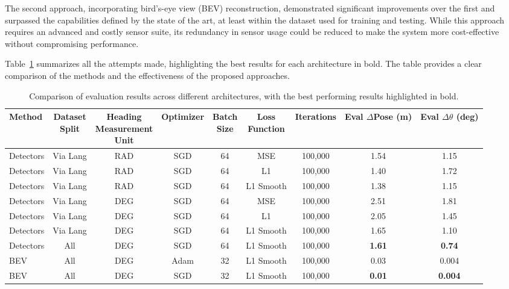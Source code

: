 The second approach, incorporating bird’s-eye view (BEV) reconstruction, demonstrated significant improvements over the first and surpassed the capabilities defined by the state of the art, at least within the dataset used for training and testing. While this approach requires an advanced and costly sensor suite, its redundancy in sensor usage could be reduced to make the system more cost-effective without compromising performance.

Table~\ref{tab:evaluation_results_2} summarizes all the attempts made, highlighting the best results for each architecture in bold. The table provides a clear comparison of the methods and the effectiveness of the proposed approaches.

\begin{table}[H]
\centering
\caption{Comparison of evaluation results across different architectures, with the best performing results highlighted in bold.}
\label{tab:evaluation_results_2}
\scriptsize
\renewcommand{\arraystretch}{1.2}
\setlength{\tabcolsep}{5pt}
\begin{tabular}{lcccccccc}
\toprule
\textbf{Method} & \makecell{\textbf{Dataset}\\\textbf{Split}} & \makecell{\textbf{Heading}\\\textbf{Measurement}\\\textbf{Unit}} & \textbf{Optimizer} & \makecell{\textbf{Batch}\\\textbf{Size}} & \makecell{\textbf{Loss}\\\textbf{Function}} & \textbf{Iterations} & \makecell{\textbf{Eval}\\$\Delta$\textbf{Pose}\\(m)} & \makecell{\textbf{Eval}\\$\Delta \theta$\\(deg)} \\
\midrule
Detectors & Via Lang & RAD & SGD  & 64 & MSE         & 100,000 & 1.54        & 1.15        \\
Detectors & Via Lang & RAD & SGD  & 64 & L1          & 100,000 & 1.40        & 1.72        \\
Detectors & Via Lang & RAD & SGD  & 64 & L1 Smooth   & 100,000 & 1.38        & 1.15        \\
Detectors & Via Lang & DEG & SGD  & 64 & MSE         & 100,000 & 2.51        & 1.81        \\
Detectors & Via Lang & DEG & SGD  & 64 & L1          & 100,000 & 2.05        & 1.45        \\
Detectors & Via Lang & DEG & SGD  & 64 & L1 Smooth   & 100,000 & 1.65        & 1.10        \\
Detectors & All      & DEG & SGD  & 64 & L1 Smooth   & 100,000 & \textbf{1.61} & \textbf{0.74} \\
BEV       & All      & DEG & Adam & 32 & L1 Smooth   & 100,000 & 0.03        & 0.004       \\
BEV       & All      & DEG & SGD  & 32 & L1 Smooth   & 100,000 & \textbf{0.01} & \textbf{0.004} \\
\bottomrule
\end{tabular}
\end{table}


